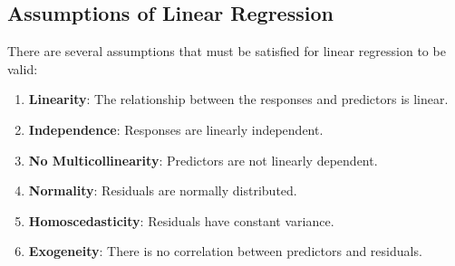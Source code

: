\documentclass{article}
\begin{document}
\subsection{Assumptions of Linear Regression}
There are several assumptions that must be satisfied for linear
regression to be valid:
\begin{enumerate}
    \item \textbf{Linearity}: The relationship between the responses and
          predictors is linear.
    \item \textbf{Independence}: Responses are linearly independent.
    \item \textbf{No Multicollinearity}: Predictors are not linearly
          dependent.
    \item \textbf{Normality}: Residuals are normally distributed.
    \item \textbf{Homoscedasticity}: Residuals have constant variance.
    \item \textbf{Exogeneity}: There is no correlation between
          predictors and residuals.
\end{enumerate}
 \newpage
\end{document}
